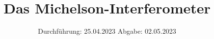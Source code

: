 

%

\subject{V401}
\title{Das Michelson-Interferometer}
\date{%
  Durchführung: 25.04.2023
  \hspace{3em}
  Abgabe: 02.05.2023
}


\setlength{\parindent}{0pt} %

\maketitle
\thispagestyle{empty}
\tableofcontents
\newpage







\printbibliography{}




